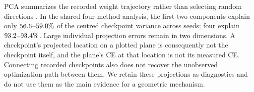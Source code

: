 PCA summarizes the recorded weight trajectory rather than selecting random directions \citep{li2018visualizing}. In the shared four-method analysis, the first two components explain only $56.6$--$59.0\%$ of the centred checkpoint variance across seeds; four explain $93.2$--$93.4\%$. Large individual projection errors remain in two dimensions. A checkpoint's projected location on a plotted plane is consequently not the checkpoint itself, and the plane's CE at that location is not its measured CE. Connecting recorded checkpoints also does not recover the unobserved optimization path between them. We retain these projections as diagnostics and do not use them as the main evidence for a geometric mechanism.
